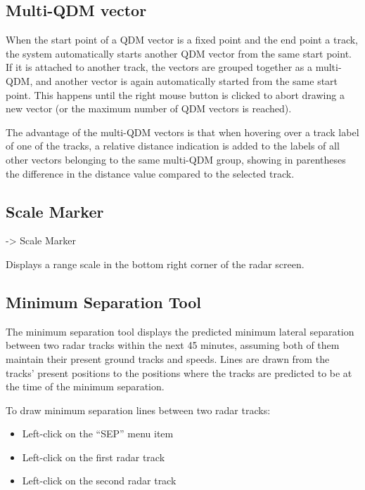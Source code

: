 \documentclass[a4paper,oneside,11pt]{memoir}
\begin{document}
\subsection{Multi-QDM vector}

When the start point of a QDM vector is a fixed point and the end point a track, the system automatically starts another QDM vector from the same start point. If it is attached to another track, the vectors are grouped together as a multi-QDM, and another vector is again automatically started from the same start point. This happens until the right mouse button is clicked to abort drawing a new vector (or the maximum number of QDM vectors is reached).

\bigskip

The advantage of the multi-QDM vectors is that when hovering over a track label of one of the tracks, a relative distance indication is added to the labels of all other vectors belonging to the same multi-QDM group, showing in parentheses the difference in the distance value compared to the selected track.

\subsection{Scale Marker}
\label{scale}

 -> Scale Marker


Displays a range scale in the bottom right corner of the radar screen.

\subsection{Minimum Separation Tool}\label{tool:mst}

The minimum separation tool displays the predicted minimum lateral separation between two radar tracks within the next 45 minutes, assuming both of them maintain their present ground tracks and speeds. Lines are drawn from the tracks’ present positions to the positions where the tracks are predicted to be at the time of the minimum separation.

To draw minimum separation lines between two radar tracks:
\begin{itemize}
    \item Left-click on the “SEP” menu item
    \item Left-click on the first radar track
    \item Left-click on the second radar track
\end{itemize}
\end{document}
